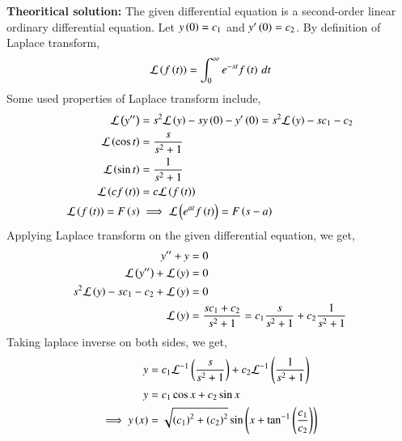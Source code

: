\documentclass[journal]{IEEEtran}
\begin{document}
\textbf{Theoritical solution:} \newline
The given differential equation is a second-order linear ordinary differential equation. \newline
Let $y\left(0\right) = c_1$ and $y^{\prime}\left(0\right) = c_2$.
By definition of Laplace transform,
\begin{align}
    \mathcal{L}\left(f\left(t\right)\right) = \int_0^{\infty} e^{-st} f\left(t\right) \, dt
\end{align}
Some used properties of Laplace transform include,
\begin{align}
    \mathcal{L}\left(y^{\prime\prime}\right) &= s^2\mathcal{L}\left(y\right) -sy\left(0\right)-y^\prime\left(0\right) = s^2\mathcal{L}\left(y\right) -sc_1 - c_2\\
    \mathcal{L}\left(\cos{t}\right) &= \frac{s}{s^2 + 1}\\
    \mathcal{L}\left(\sin{t}\right) &= \frac{1}{s^2 + 1}\\
    \mathcal{L}\left(cf\left(t\right)\right) &= c\mathcal{L}\left(f\left(t\right)\right)\\
    \mathcal{L}\left(f\left(t\right)\right) = F\left(s\right) &\implies \mathcal{L}\left(e^{at}f\left(t\right)\right) = F\left(s-a\right)
\end{align}
Applying Laplace transform on the given differential equation, we get,
\begin{align}
    y^{\prime\prime} + y &= 0\\
    \mathcal{L}\left(y^{\prime\prime}\right) + \mathcal{L}\left(y\right) &= 0\\
    s^2\mathcal{L}\left(y\right) - sc_1 - c_2 + \mathcal{L}\left(y\right) &= 0\\
    \mathcal{L}\left(y\right) &= \frac{sc_1 + c_2}{s^2 + 1} = c_1\frac{s}{s^2 + 1} + c_2\frac{1}{s^2 + 1}\\
\end{align}
Taking laplace inverse on both sides, we get,
\begin{align}
    y &= c_1\mathcal{L}^{-1}\left(\frac{s}{s^2 + 1}\right) + c_2\mathcal{L}^{-1}\left(\frac{1}{s^2 + 1}\right)\\
    y &= c_1\cos{x} + c_2\sin{x}\\
    \implies y\left(x\right) &= \sqrt{\left(c_1\right)^2 + \left(c_2\right)^2} \sin{\ensuremath{\left(x + \tan^{-1}{\left(\frac{c_1}{c_2}\right)}\right)}}
\end{align}
\end{document}
